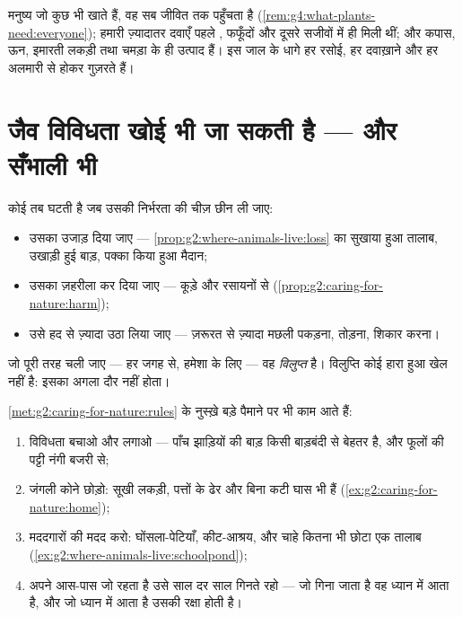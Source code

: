\begin{example}[लोग जाल से जीते हैं]\label{ex:g5:biodiversity:people}
मनुष्य जो कुछ भी खाते हैं, वह सब जीवित  तक पहुँचता है
(\cref{rem:g4:what-plants-need:everyone}); हमारी ज़्यादातर दवाएँ पहले
, फफूँदों और दूसरे सजीवों में ही मिली थीं; और कपास, ऊन, इमारती
लकड़ी तथा चमड़ा  के ही उत्पाद हैं। इस जाल के धागे हर रसोई, हर
दवाख़ाने और हर अलमारी से होकर गुज़रते हैं।
\end{example}

\section{जैव विविधता खोई भी जा सकती है --- और सँभाली भी}

\begin{proposition}[विविधता कैसे खोती है]\label{prop:g5:biodiversity:loss}
कोई  तब घटती है जब उसकी निर्भरता की चीज़ छीन ली जाए:
\begin{itemize}
  \item उसका \emph{} उजाड़ दिया जाए ---
        \cref{prop:g2:where-animals-live:loss} का सुखाया हुआ तालाब,
        उखाड़ी हुई बाड़, पक्का किया हुआ मैदान;
  \item उसका  ज़हरीला कर दिया जाए --- कूड़े और रसायनों से
        (\cref{prop:g2:caring-for-nature:harm});
  \item उसे हद से ज़्यादा उठा लिया जाए --- ज़रूरत से ज़्यादा मछली
        पकड़ना, तोड़ना, शिकार करना।
\end{itemize}
जो  पूरी तरह चली जाए --- हर जगह से, हमेशा के लिए --- वह
\emph{विलुप्त} है। विलुप्ति कोई हारा हुआ खेल नहीं है:
इसका अगला दौर नहीं होता।
\end{proposition}
\admitted

\begin{method}\label{met:g5:biodiversity:help}
\cref{met:g2:caring-for-nature:rules} के नुस्ख़े बड़े पैमाने पर भी
काम आते हैं:
\begin{enumerate}
  \item विविधता बचाओ और लगाओ --- पाँच झाड़ियों की बाड़ किसी बाड़बंदी से
        बेहतर है, और फूलों की पट्टी नंगी बजरी से;
  \item जंगली कोने छोड़ो: सूखी लकड़ी, पत्तों के ढेर और बिना कटी घास भी
         हैं (\cref{ex:g2:caring-for-nature:home});
  \item मददगारों की मदद करो: घोंसला-पेटियाँ, कीट-आश्रय, और चाहे कितना
        भी छोटा एक तालाब
        (\cref{ex:g2:where-animals-live:schoolpond});
  \item अपने आस-पास जो रहता है उसे साल दर साल गिनते रहो --- जो गिना
        जाता है वह ध्यान में आता है, और जो ध्यान में आता है उसकी
        रक्षा होती है।
\end{enumerate}
\end{method}

